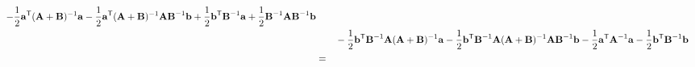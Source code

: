 \documentclass{amsmlaj}
\begin{document}
\begin{problem}
\begin{enumerate}
\begin{equation}
\begin{split}
						-\frac{1}{2}\vt{a}^\trans(\vt{A}+\vt{B})^{-1}\vt{a}
						-\frac{1}{2}\vt{a}^\trans(\vt{A}+\vt{B})^{-1}\vt{A}\vt{B}^{-1}\vt{b}
						+\frac{1}{2}\vt{b}^\trans\vt{B}^{-1}\vt{a}
						+\frac{1}{2}\vt{B}^{-1}\vt{A}\vt{B}^{-1}\vt{b} \\
						&\qquad-\frac{1}{2}\vt{b}^\trans\vt{B}^{-1}\vt{A}(\vt{A}+\vt{B})^{-1}\vt{a}
						-\frac{1}{2}\vt{b}^\trans\vt{B}^{-1}\vt{A}(\vt{A}+\vt{B})^{-1}\vt{A}\vt{B}^{-1}\vt{b}
						-\frac{1}{2}\vt{a}^\trans\vt{A}^{-1}\vt{a}
						-\frac{1}{2}\vt{b}^\trans\vt{B}^{-1}\vt{b} \\
						&=
		\end{split}
	\end{equation}

\end{enumerate}
\end{problem}
\end{document}
